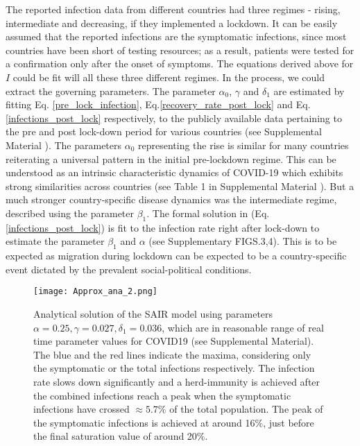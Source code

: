 \documentclass[aps,prl,reprint,superscriptaddress]{revtex4-1}
\begin{document}
The reported infection data from different countries had three regimes - rising, intermediate and decreasing, if they implemented a lockdown. It can be easily assumed that the reported infections are the symptomatic infections, since most countries have been short of testing resources; as a result, patients were tested for a confirmation only after the onset of symptoms. The equations derived above for $I$ could be fit will all these three different regimes. In the process, we could extract the governing parameters. The parameter $\alpha_0$, $\gamma$ and $\delta_1$ are estimated by fitting Eq. \eqref{pre_lock_infection}, Eq.\eqref{recovery_rate_post_lock} and Eq.\eqref{infections_post_lock} respectively, to the publicly available data pertaining to the pre and post lock-down period for various countries (see Supplemental Material \cite{supp}). The parameters $\alpha_0$ representing the rise is similar for many countries reiterating a universal pattern in the initial pre-lockdown regime. This can be understood as an intrinsic characteristic dynamics of COVID-19 which exhibits strong similarities across countries (see Table 1 in Supplemental Material \cite{supp}). But a much stronger country-specific disease dynamics was the intermediate regime, described using the parameter $\beta_1$. The formal solution in (Eq. \ref{infections_post_lock}) is fit to the infection rate right after lock-down to estimate the parameter $\beta_1$ and $\alpha$ (see Supplementary FIGS.3,4). This is to be expected as migration during lockdown can be expected to be a country-specific event dictated by the prevalent social-political conditions. 
 


\begin{figure}[h]
	\texttt{[image: Approx\_ana\_2.png]}
	\caption{\label{fig2} Analytical solution of the SAIR model using parameters $\alpha=0.25, \gamma = 0.027, \delta_1 = 0.036$, which are in reasonable range of real time parameter values for COVID19 (see Supplemental Material). The blue and the red lines indicate the maxima, considering only the symptomatic or the total infections respectively. The infection rate slows down significantly and a herd-immunity is achieved after the combined infections reach a peak when the symptomatic infections have crossed $\approx 5.7\%$ of the total population. The peak of the symptomatic infections is achieved at around 16\%, just before the final saturation value of around 20\%.}
\end{figure}
\end{document}
